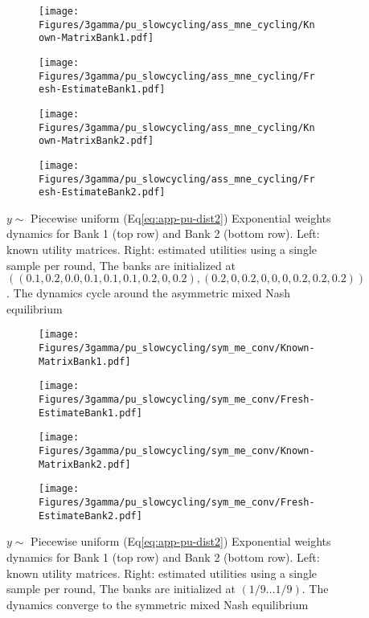 \begin{figure}[H]
    \centering
    \begin{subfigure}{0.49\linewidth}
        \centering
        \texttt{[image: Figures/3gamma/pu\_slowcycling/ass\_mne\_cycling/Known-MatrixBank1.pdf]}
    \end{subfigure}
    \begin{subfigure}{0.49\linewidth}
        \centering
        \texttt{[image: Figures/3gamma/pu\_slowcycling/ass\_mne\_cycling/Fresh-EstimateBank1.pdf]}
    \end{subfigure}

    \begin{subfigure}{0.49\linewidth}
        \centering
        \texttt{[image: Figures/3gamma/pu\_slowcycling/ass\_mne\_cycling/Known-MatrixBank2.pdf]}
    \end{subfigure}
    \begin{subfigure}{0.49\linewidth}
        \centering
        \texttt{[image: Figures/3gamma/pu\_slowcycling/ass\_mne\_cycling/Fresh-EstimateBank2.pdf]}
    \end{subfigure}
\caption{$y \sim$ Piecewise uniform (Eq\eqref{eq:app-pu-dist2}) Exponential weights dynamics for Bank 1 (top row) and Bank 2 (bottom row). Left: known utility matrices. Right: estimated utilities using a single sample per round, The banks are initialized at $((0.1, 0.2, 0.0, 0.1, 0.1, 0.1, 0.2, 0, 0.2), (0.2, 0, 0.2, 0, 0, 0, 0.2, 0.2, 0.2))$. The dynamics cycle around the asymmetric mixed Nash equilibrium \label{fig:dyna-puf-slowcycles-ass}}
\end{figure}

\begin{figure}[H]
    \centering
    \begin{subfigure}{0.49\linewidth}
        \centering
        \texttt{[image: Figures/3gamma/pu\_slowcycling/sym\_me\_conv/Known-MatrixBank1.pdf]}
    \end{subfigure}
    \begin{subfigure}{0.49\linewidth}
        \centering
        \texttt{[image: Figures/3gamma/pu\_slowcycling/sym\_me\_conv/Fresh-EstimateBank1.pdf]}
    \end{subfigure}

    \begin{subfigure}{0.49\linewidth}
        \centering
        \texttt{[image: Figures/3gamma/pu\_slowcycling/sym\_me\_conv/Known-MatrixBank2.pdf]}
    \end{subfigure}
    \begin{subfigure}{0.49\linewidth}
        \centering
        \texttt{[image: Figures/3gamma/pu\_slowcycling/sym\_me\_conv/Fresh-EstimateBank2.pdf]}
    \end{subfigure}
\caption{$y \sim$ Piecewise uniform (Eq\eqref{eq:app-pu-dist2}) Exponential weights dynamics for Bank 1 (top row) and Bank 2 (bottom row). Left: known utility matrices. Right: estimated utilities using a single sample per round, The banks are initialized at $(1/9 \ldots 1/9)$. The dynamics converge to the symmetric mixed Nash equilibrium \label{fig:dyna-puf-slowcycles-sym}}
\end{figure}